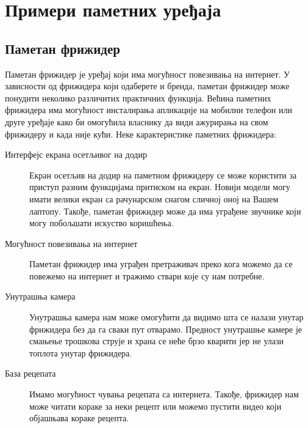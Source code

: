 \documentclass[a4paper]{article}
\begin{document}
\section{Примери паметних уређаја}

\subsection{Паметан фрижидер}
Паметан фрижидер је уређај који има могућност повезивања на интернет. У зависности од фрижидера који одаберете и бренда, паметан фрижидер може понудити
неколико различитих практичних функција. Већина паметних фрижидера има могућност инсталирања апликације на мобилни телефон или друге уређаје како би омогућила
власнику да види ажурирања на свом фрижидеру и када није кући.
\newline\newline Неке карактеристике паметних фрижидера:
\begin{description}
    \item[Интерфејс екрана осетљивог на додир]
    Екран осетљив на додир на паметном фрижидеру се може користити за приступ разним функцијама притиском на екран. Новији модели могу имати велики екран
    са рачунарском снагом сличној оној на Вашем лаптопу. Такође, паметан фрижидер може да има уграђене звучнике који могу побољшати искуство коришћења.
    \item[Могућност повезивања на интернет]
    Паметан фрижидер има уграђен претраживач преко кога можемо да се повежемо на интернет и тражимо ствари које су нам потребне.
    \item[Унутрашња камера]
    Унутрашња камера нам може омогућити да видимо шта се налази унутар фрижидера без да га сваки пут отварамо. Предност унутрашње камере је смањење трошкова
    струје и храна се неће брзо кварити јер не улази топлота унутар фрижидера.
    \item[База рецепата]
    Имамо могућност чувања рецепата са интернета. Такође, фрижидер нам може читати кораке за неки рецепт или можемо пустити видео који објашњава кораке рецепта.
\end{description}
\end{document}
